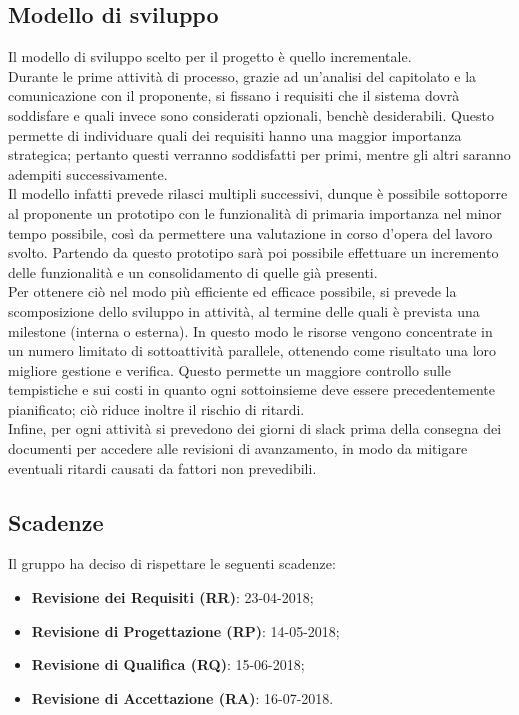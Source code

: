 \subsection{Modello di sviluppo}
Il modello di sviluppo scelto per il progetto è quello incrementale.\\
Durante le prime attività di processo, grazie ad un'analisi del capitolato e la comunicazione con il proponente, si fissano i requisiti che il sistema dovrà soddisfare e quali invece sono considerati opzionali, benchè desiderabili. Questo permette di individuare quali dei requisiti hanno una maggior importanza strategica; pertanto questi verranno soddisfatti per primi, mentre gli altri saranno adempiti successivamente.\\
Il modello infatti prevede rilasci multipli successivi, dunque è possibile sottoporre al proponente un prototipo con le funzionalità di primaria importanza nel minor tempo possibile, così da permettere una valutazione in corso d’opera del lavoro svolto. Partendo da questo prototipo sarà poi possibile effettuare un incremento delle funzionalità e un consolidamento di quelle già presenti.\\
Per ottenere ciò nel modo più efficiente ed efficace possibile, si prevede la scomposizione dello sviluppo in attività, al termine delle quali è prevista una milestone (interna o esterna). In questo modo le risorse vengono concentrate in un numero limitato di sottoattività parallele, ottenendo come risultato una loro migliore gestione e verifica.
Questo permette un maggiore controllo sulle tempistiche e sui costi in quanto ogni sottoinsieme deve essere precedentemente pianificato; ciò riduce inoltre il rischio di ritardi.\\
Infine, per ogni attività si prevedono dei giorni di slack prima della consegna dei documenti per accedere alle revisioni di avanzamento, in modo da mitigare eventuali ritardi causati da fattori non prevedibili.

\subsection{Scadenze}
Il gruppo \Gruppo ha deciso di rispettare le seguenti scadenze:
\begin{itemize}
	\item \textbf{Revisione dei Requisiti (RR)}: 23-04-2018;
	\item \textbf{Revisione di Progettazione (RP)}: 14-05-2018;
	\item \textbf{Revisione di Qualifica (RQ)}: 15-06-2018;
	\item \textbf{Revisione di Accettazione (RA)}: 16-07-2018.
\end{itemize}
